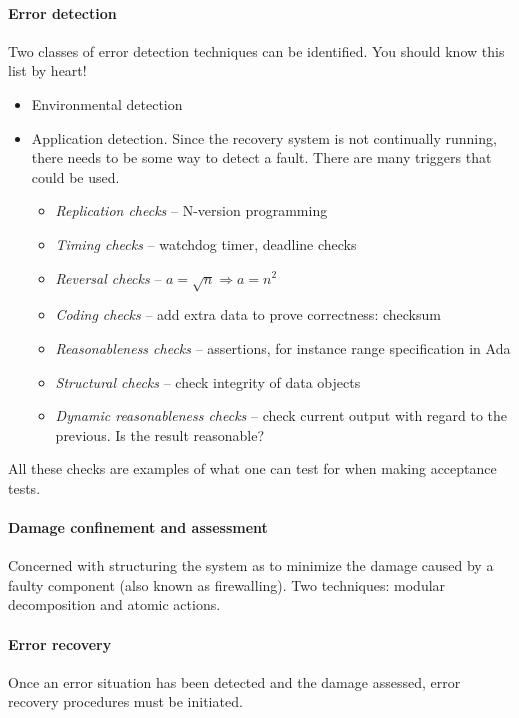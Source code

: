 \paragraph{Error detection} Two classes of error detection techniques can be identified. You should know this list by heart!
\begin{itemize}[nolistsep,noitemsep]
  \item Environmental detection
  \item Application detection. Since the recovery system is not continually running, there needs to be some way to detect a fault. There are many triggers that could be used.
  \begin{itemize}[nolistsep,noitemsep]
    \item \textit{Replication checks} -- N-version programming
    \item \textit{Timing checks} -- watchdog timer, deadline checks
    \item \textit{Reversal checks} -- $a = \sqrt{n} \Rightarrow a = n^2$
    \item \textit{Coding checks} -- add extra data to prove correctness: checksum
    \item \textit{Reasonableness checks} -- assertions, for instance range specification in Ada
    \item \textit{Structural checks} -- check integrity of data objects
    \item \textit{Dynamic reasonableness checks} -- check current output with regard to the previous. Is the result reasonable?
  \end{itemize}
\end{itemize}

All these checks are examples of what one can test for when making acceptance tests.

\paragraph{Damage confinement and assessment} Concerned with structuring the system as to minimize the damage caused by a faulty component (also known as firewalling). Two techniques: modular decomposition and atomic actions.

\paragraph{Error recovery} Once an error situation has been detected and the damage assessed, error recovery procedures must be initiated.

